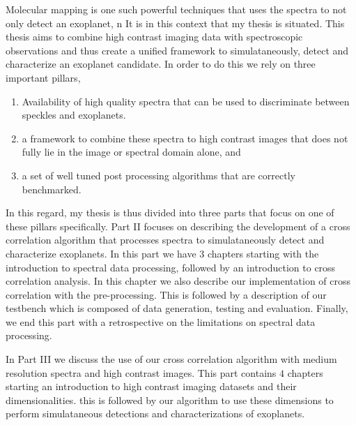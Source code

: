 Molecular mapping is one such powerful techniques that uses the spectra to not only detect an exoplanet, n
It is in this context that my thesis is situated.
This thesis aims to combine high contrast imaging data with spectroscopic observations and thus create a unified framework to simulataneously,
detect and characterize an exoplanet candidate.
In order to do this we rely on three important pillars,
\begin{enumerate}
    \item Availability of high quality spectra that can be used to discriminate between speckles and exoplanets.
    \item a framework to combine these spectra to high contrast images that does not fully lie in the image or spectral domain alone, and
    \item a set of well tuned post processing algorithms that are correctly benchmarked.
\end{enumerate}
In this regard, my thesis is thus divided into three parts that focus on one of these pillars specifically.
Part II focuses on describing the development of a cross correlation algorithm that processes spectra to simulataneously\@
detect and characterize exoplanets.
In this part we have $3$ chapters starting with the introduction to spectral data processing, followed by an introduction
to cross correlation analysis. 
In this chapter we also describe our implementation of cross correlation with the pre-processing.
This is followed by a description of our testbench which is composed of data generation, testing and evaluation.
Finally, we end this part with a retrospective on the limitations on spectral data processing. 

In Part III we discuss the use of our cross correlation algorithm with medium resolution spectra and high contrast images.
This part contains $4$ chapters starting an introduction to high contrast imaging datasets and their dimensionalities.
this is followed by our algorithm to use these dimensions to perform simulataneous detections and characterizations of exoplanets.
